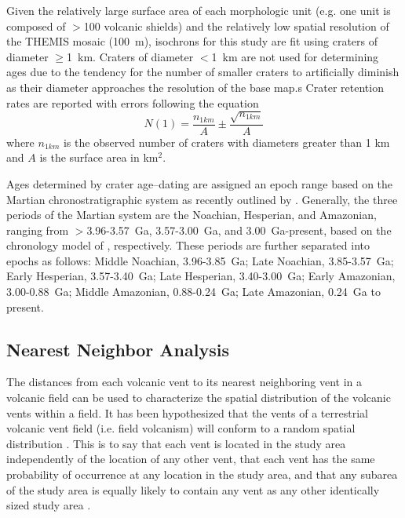 Given the relatively large surface area of each morphologic unit (e.g. one unit is composed of $>$100 volcanic shields) and the relatively low spatial resolution of the THEMIS mosaic (100~m), isochrons for this study are fit using craters of diameter $\ge$1~km. Craters of diameter $<$1~km are not used for determining ages due to the tendency for the number of smaller craters to artificially diminish as their diameter approaches the resolution of the base map.s Crater retention rates are reported with errors following the equation
\begin{equation}
N(1) = \frac{n_{1km}}{A} \pm \frac{\sqrt{n_{1km}}}{A} \label{eq1}
\end{equation} 
where $n_{1km}$ is the observed number of craters with diameters greater than 1 km and $A$ is the surface area in km$^2$.

Ages determined by crater age--dating are assigned an epoch range based on the Martian chronostratigraphic system as recently outlined by \citet{Werner2011}. Generally, the three periods of the Martian system are the Noachian, Hesperian, and Amazonian, ranging from $>$3.96-3.57~Ga, 3.57-3.00~Ga, and 3.00~Ga-present, based on the chronology model of \citet{Hartmann2005}, respectively. These periods are further separated into epochs as follows: Middle Noachian, 3.96-3.85~Ga; Late Noachian, 3.85-3.57~Ga; Early Hesperian, 3.57-3.40~Ga; Late Hesperian, 3.40-3.00~Ga; Early Amazonian, 3.00-0.88~Ga; Middle Amazonian, 0.88-0.24~Ga; Late Amazonian, 0.24~Ga to present.

\subsection{Nearest Neighbor Analysis}
\label{sec:methodNN}

The distances from each volcanic vent to its nearest neighboring vent in a volcanic field can be used to characterize the spatial distribution of the volcanic vents within a field. It has been hypothesized that the vents of a terrestrial volcanic vent field (i.e. field volcanism) will conform to a random spatial distribution \citep{Lutz1986,Lutz1995}. This is to say that each vent is located in the study area independently of the location of any other vent, that each vent has the same probability of occurrence at any location in the study area, and that any subarea of the study area is equally likely to contain any vent as any other identically sized study area \citep{Clark1954}.

